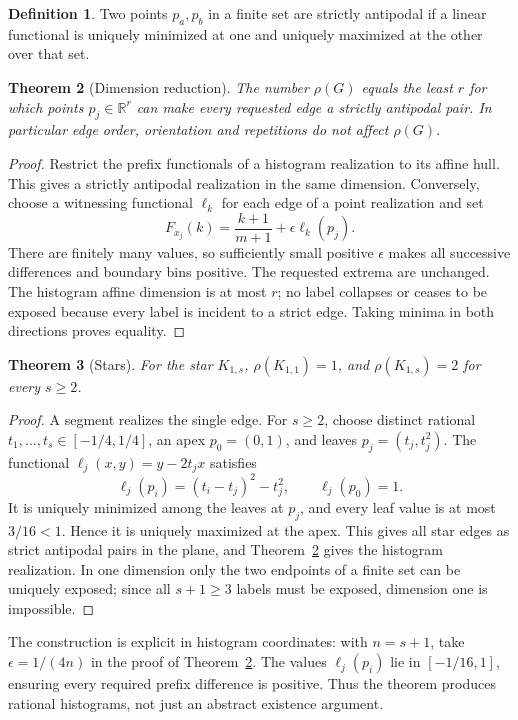 \documentclass[11pt]{article}
\newtheorem{theorem}{Theorem}[section]
\theoremstyle{definition}\newtheorem{definition}[theorem]{Definition}
\newcommand{\R}{\mathbb R}
\newcommand{\1}{\mathbf 1}
\begin{document}
\begin{definition}
Two points $p_a,p_b$ in a finite set are strictly antipodal if a linear functional
is uniquely minimized at one and uniquely maximized at the other over that set.
\end{definition}
\begin{theorem}[Dimension reduction]\label{thm:antipodal}
The number $\rho(G)$ equals the least $r$ for which points $p_j\in\R^r$ can
make every requested edge a strictly antipodal pair. In particular edge order,
orientation and repetitions do not affect $\rho(G)$.
\end{theorem}
\begin{proof}
Restrict the prefix functionals of a histogram realization to its affine hull.
This gives a strictly antipodal realization in the same dimension. Conversely,
choose a witnessing functional $\ell_k$ for each edge of a point realization
and set
\[
 F_{x_j}(k)=\frac{k+1}{m+1}+\epsilon\ell_k(p_j).
\]
There are finitely many values, so sufficiently small positive $\epsilon$ makes
all successive differences and boundary bins positive. The requested extrema
are unchanged. The histogram affine dimension is at most $r$; no label
collapses or ceases to be exposed because every label is incident to a strict
edge. Taking minima in both directions proves equality.
\end{proof}

\begin{theorem}[Stars]\label{thm:stars}
For the star $K_{1,s}$, $\rho(K_{1,1})=1$, and $\rho(K_{1,s})=2$ for every
$s\ge2$.
\end{theorem}
\begin{proof}
A segment realizes the single edge. For $s\ge2$, choose distinct rational
$t_1,\ldots,t_s\in[-1/4,1/4]$, an apex $p_0=(0,1)$, and leaves
$p_j=(t_j,t_j^2)$. The functional $\ell_j(x,y)=y-2t_jx$ satisfies
\[
 \ell_j(p_i)=(t_i-t_j)^2-t_j^2,\qquad \ell_j(p_0)=1.
\]
It is uniquely minimized among the leaves at $p_j$, and every leaf value is
at most $3/16<1$. Hence it is uniquely maximized at the apex. This gives all
star edges as strict antipodal pairs in the plane, and
Theorem~\ref{thm:antipodal} gives the histogram realization. In one dimension
only the two endpoints of a finite set can be uniquely exposed; since all
$s+1\ge3$ labels must be exposed, dimension one is impossible.
\end{proof}

The construction is explicit in histogram coordinates: with $n=s+1$, take
$\epsilon=1/(4n)$ in the proof of Theorem~\ref{thm:antipodal}. The values
$\ell_j(p_i)$ lie in $[-1/16,1]$, ensuring every required prefix difference is
positive. Thus the theorem produces rational histograms, not just an abstract
existence argument.
\end{document}
